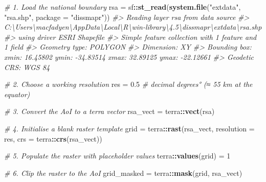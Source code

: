 \documentclass[
]{article}
\newenvironment{Shaded}{\begin{snugshade}}{\end{snugshade}}
\newcommand{\AttributeTok}[1]{\textcolor[rgb]{0.13,0.29,0.53}{#1}}
\newcommand{\CommentTok}[1]{\textcolor[rgb]{0.56,0.35,0.01}{\textit{#1}}}
\newcommand{\DecValTok}[1]{\textcolor[rgb]{0.00,0.00,0.81}{#1}}
\newcommand{\FloatTok}[1]{\textcolor[rgb]{0.00,0.00,0.81}{#1}}
\newcommand{\FunctionTok}[1]{\textcolor[rgb]{0.13,0.29,0.53}{\textbf{#1}}}
\newcommand{\NormalTok}[1]{#1}
\newcommand{\OtherTok}[1]{\textcolor[rgb]{0.56,0.35,0.01}{#1}}
\newcommand{\SpecialCharTok}[1]{\textcolor[rgb]{0.81,0.36,0.00}{\textbf{#1}}}
\newcommand{\StringTok}[1]{\textcolor[rgb]{0.31,0.60,0.02}{#1}}
\begin{document}
\begin{Shaded}
\begin{Highlighting}[]
\CommentTok{\# 1. Load the national boundary }
\NormalTok{rsa }\OtherTok{=}\NormalTok{ sf}\SpecialCharTok{::}\FunctionTok{st\_read}\NormalTok{(}\FunctionTok{system.file}\NormalTok{(}\StringTok{"extdata"}\NormalTok{, }\StringTok{"rsa.shp"}\NormalTok{, }\AttributeTok{package =} \StringTok{"dissmapr"}\NormalTok{))}
\CommentTok{\#\textgreater{} Reading layer \textasciigrave{}rsa\textquotesingle{} from data source }
\CommentTok{\#\textgreater{}   \textasciigrave{}C:\textbackslash{}Users\textbackslash{}macfadyen\textbackslash{}AppData\textbackslash{}Local\textbackslash{}R\textbackslash{}win{-}library\textbackslash{}4.5\textbackslash{}dissmapr\textbackslash{}extdata\textbackslash{}rsa.shp\textquotesingle{} }
\CommentTok{\#\textgreater{}   using driver \textasciigrave{}ESRI Shapefile\textquotesingle{}}
\CommentTok{\#\textgreater{} Simple feature collection with 1 feature and 1 field}
\CommentTok{\#\textgreater{} Geometry type: POLYGON}
\CommentTok{\#\textgreater{} Dimension:     XY}
\CommentTok{\#\textgreater{} Bounding box:  xmin: 16.45802 ymin: {-}34.83514 xmax: 32.89125 ymax: {-}22.12661}
\CommentTok{\#\textgreater{} Geodetic CRS:  WGS 84}

\CommentTok{\# 2. Choose a working resolution }
\NormalTok{res }\OtherTok{=} \FloatTok{0.5}   \CommentTok{\# decimal degrees° (≈ 55 km at the equator)}

\CommentTok{\# 3. Convert the AoI to a \textquotesingle{}terra\textquotesingle{} vector }
\NormalTok{rsa\_vect }\OtherTok{=}\NormalTok{ terra}\SpecialCharTok{::}\FunctionTok{vect}\NormalTok{(rsa)}

\CommentTok{\# 4. Initialise a blank raster template }
\NormalTok{grid }\OtherTok{=}\NormalTok{ terra}\SpecialCharTok{::}\FunctionTok{rast}\NormalTok{(rsa\_vect, }\AttributeTok{resolution =}\NormalTok{ res, }\AttributeTok{crs =}\NormalTok{ terra}\SpecialCharTok{::}\FunctionTok{crs}\NormalTok{(rsa\_vect))}

\CommentTok{\# 5. Populate the raster with placeholder values }
\NormalTok{terra}\SpecialCharTok{::}\FunctionTok{values}\NormalTok{(grid) }\OtherTok{=} \DecValTok{1}

\CommentTok{\# 6. Clip the raster to the AoI }
\NormalTok{grid\_masked }\OtherTok{=}\NormalTok{ terra}\SpecialCharTok{::}\FunctionTok{mask}\NormalTok{(grid, rsa\_vect)}


\end{Highlighting}
\end{Shaded}
\end{document}
